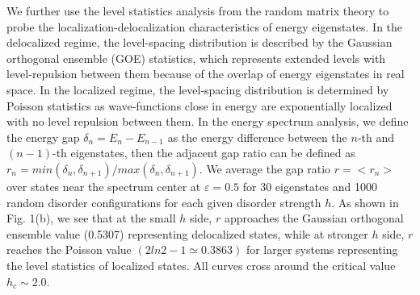 \documentclass[prl,aps,epsf,showpacs,twocolumn]{revtex4}
\begin{document}
We further use the  level statistics analysis from the random matrix theory\cite{atas2013,oganesyan2007}
  to probe the localization-delocalization characteristics
of  energy  eigenstates.
In the delocalized  regime, the level-spacing  distribution
is described by the   Gaussian orthogonal ensemble (GOE) statistics, which
represents extended levels with level-repulsion  between them because
of the overlap of  energy eigenstates in real space.
In the localized regime, the level-spacing distribution  is
determined by Poisson statistics as  wave-functions
close in energy are exponentially localized with no
level repulsion between them\cite{mehta1991}.
In the energy spectrum analysis\cite{luitz2015},
we define the energy gap $\delta_n=E_n-E_{n-1}$ as the energy difference between the $n$-th and $(n-1)$-th eigenstates,
then the adjacent gap ratio can be defined as
$r_n=min(\delta_n, \delta_{n+1})/max(\delta_n, \delta_{n+1})$.
We  average the gap ratio $r=<r_n>$  over  states near the spectrum center
at $\varepsilon=0.5$ for 30 eigenstates and 1000 random disorder configurations
for each given disorder  strength $h$.   As shown in Fig. 1(b),   we see that at the small
$h$ side, $r$ approaches  the Gaussian  orthogonal ensemble  value (0.5307) representing delocalized states, while at stronger
$h$ side,  $r$ reaches the Poisson value $(2ln2-1\simeq 0.3863)$ for larger systems representing the level statistics of   localized states.
All curves cross around the  critical value $h_c \sim 2.0$.  
\end{document}
